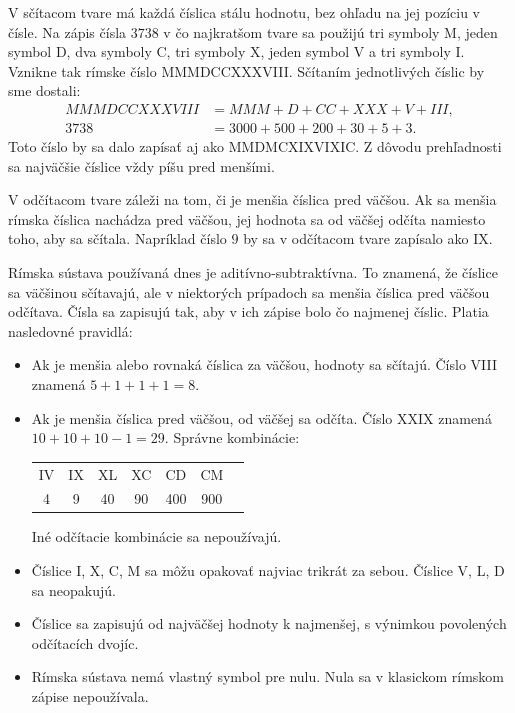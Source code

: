 \documentclass{article}
\begin{document}
V sčítacom tvare má každá číslica stálu hodnotu, bez ohľadu na jej pozíciu v čísle. Na zápis čísla \(3738\) v čo najkratšom tvare sa použijú tri symboly M, jeden symbol D, dva symboly C, tri symboly X, jeden symbol V a tri symboly I. Vznikne tak rímske číslo MMMDCCXXXVIII. Sčítaním jednotlivých číslic by sme dostali:
\begin{align*}
  MMMDCCXXXVIII &= MMM + D + CC + XXX + V + III, \\
  3738 &= 3000 + 500 + 200 + 30 + 5 + 3.
\end{align*}
Toto číslo by sa dalo zapísať aj ako MMDMCXIXVIXIC. Z dôvodu prehľadnosti sa najväčšie číslice vždy píšu pred menšími.

V odčítacom tvare záleži na tom, či je menšia číslica pred väčšou. Ak sa menšia rímska číslica nachádza pred väčšou, jej hodnota sa od väčšej odčíta namiesto toho, aby sa sčítala. Napríklad číslo \(9\) by sa v odčítacom tvare zapísalo ako IX.

Rímska sústava používaná dnes je aditívno‑subtraktívna. To znamená, že číslice sa väčšinou sčítavajú, ale v niektorých prípadoch sa menšia číslica pred väčšou odčítava. Čísla sa zapisujú tak, aby v ich zápise bolo čo najmenej číslic. Platia nasledovné pravidlá:

\begin{itemize}
  \item Ak je menšia alebo rovnaká číslica za väčšou, hodnoty sa sčítajú. Číslo VIII znamená \(5 + 1 + 1 + 1 = 8\).
  \item Ak je menšia číslica pred väčšou, od väčšej sa odčíta. Číslo XXIX znamená \(10 + 10 + 10 - 1 = 29\). Správne kombinácie:
  \begin{center}
    \begin{tabular}{|c|c|c|c|c|c|c|}
    IV & IX & XL & XC & CD & CM \\
    4 & 9 & 40 & 90 & 400 & 900 \\
    \end{tabular}
  \end{center}
  Iné odčítacie kombinácie sa nepoužívajú.
  \item Číslice I, X, C, M sa môžu opakovať najviac trikrát za sebou. Číslice V, L, D sa neopakujú.
  \item Číslice sa zapisujú od najväčšej hodnoty k najmenšej, s výnimkou povolených odčítacích dvojíc.
  \item Rímska sústava nemá vlastný symbol pre nulu. Nula sa v klasickom rímskom zápise nepoužívala.
\end{itemize}
\end{document}
